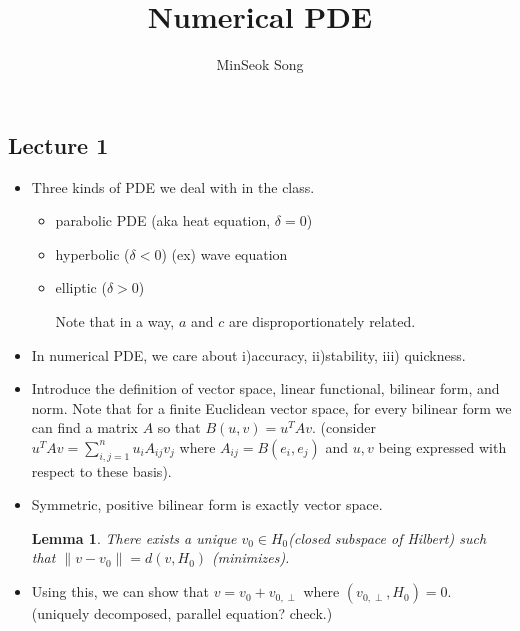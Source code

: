 \documentclass{article}
\title{Numerical PDE}
\author{MinSeok Song}
\date{}
\newtheorem{lemma}[theorem]{Lemma}
\theoremstyle{remark}
\begin{document}
\maketitle 
\subsection*{Lecture 1}
\begin{itemize}
\item Three kinds of PDE we deal with in the class.
\begin{itemize}
\item parabolic PDE (aka heat equation, $\delta=0$)
\item hyperbolic ($\delta<0$) (ex) wave equation
\item elliptic ($\delta>0$)

Note that in a way, $a$ and $c$ are disproportionately related.
\end{itemize}
\item In numerical PDE, we care about i)accuracy, ii)stability, iii) quickness.

\item Introduce the definition of vector space, linear functional, bilinear form, and norm. 
Note that for a finite Euclidean vector space, for every bilinear form we can find a matrix $A$ so that $B(u,v)=u^TAv$. (consider $u^TAv=\sum^n_{i,j=1}u_iA_{ij}v_j$ where $A_{ij}=B(e_i,e_j)$ and $u,v$ being expressed with respect to these basis).

\item Symmetric, positive bilinear form is exactly vector space.
\begin{lemma}
There exists a unique $v_0\in H_0$(closed subspace of Hilbert) such that $\lVert v-v_0\rVert=d(v,H_0)$ (minimizes).
\end{lemma}

\item Using this, we can show that $v=v_0+v_{0,\perp}$ where $(v_{0,\perp},H_0)=0$.
(uniquely decomposed, parallel equation? check.)

\end{itemize}
\end{document}
